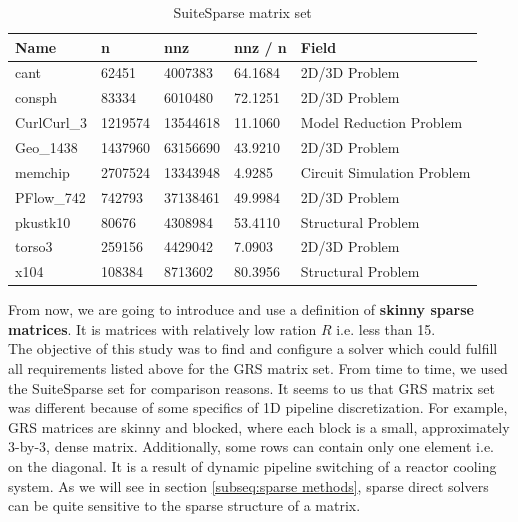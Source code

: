 \begin{table}[ht]
\centering
\begin{tabular}{|l|l|l|l|l|}
\hline
Name        & n       & nnz      & nnz / n & Field                      \\ \hline
cant        & 62451   & 4007383  & 64.1684 & 2D/3D Problem              \\ \hline
consph      & 83334   & 6010480  & 72.1251 & 2D/3D Problem              \\ \hline
CurlCurl\_3 & 1219574 & 13544618 & 11.1060 & Model Reduction Problem    \\ \hline
Geo\_1438   & 1437960 & 63156690 & 43.9210 & 2D/3D Problem              \\ \hline
memchip     & 2707524 & 13343948 & 4.9285  & Circuit Simulation Problem \\ \hline
PFlow\_742  & 742793  & 37138461 & 49.9984 & 2D/3D Problem              \\ \hline
pkustk10    & 80676   & 4308984  & 53.4110 & Structural Problem         \\ \hline
torso3      & 259156  & 4429042  & 7.0903  & 2D/3D Problem              \\ \hline
x104        & 108384  & 8713602  & 80.3956 & Structural Problem         \\ \hline
\end{tabular}
\caption{SuiteSparse matrix set}
\label{table:suite-sparse-matrix-set}
\end{table}


From now, we are going to introduce and use a definition of \textbf{skinny sparse matrices}. It is matrices with relatively low  ration $R$ i.e. less than 15. \\ 


The objective of this study was to find and configure a solver which could fulfill all requirements listed above for the GRS matrix set. From time to time, we used the SuiteSparse set for comparison reasons. It seems to us that GRS matrix set was different because of some specifics of 1D pipeline discretization. For example, GRS matrices are skinny and blocked, where each block is a small, approximately 3-by-3, dense matrix. Additionally, some rows can contain only one element i.e. on the diagonal. It is a result of dynamic pipeline switching of a reactor cooling system. As we will see in section \ref{subseq:sparse methods}, sparse direct solvers can be quite sensitive to the sparse structure of a matrix.\\


